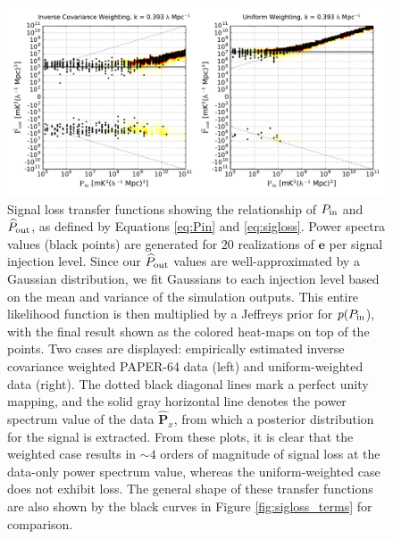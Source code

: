 \documentclass[preprint2,numberedappendix,tighten]{aastex6}  %
\begin{document}
\begin{figure}
	\centering
	\includegraphics[width=1\textwidth]{plots/sigloss_transfercurve_posneg.pdf}
	\caption{Signal loss transfer functions showing the relationship of $P_{\rm in}$ and $\widehat{P}_{\rm out}$, as defined by Equations \eqref{eq:Pin} and \eqref{eq:sigloss}. Power spectra values (black points) are generated for $20$ realizations of $\textbf{e}$ per signal injection level. Since our $\widehat{P}_{\rm out}$ values are well-approximated by a Gaussian distribution, we fit Gaussians to each injection level based on the mean and variance of the simulation outputs. This entire likelihood function is then multiplied by a Jeffreys prior for $p(P_{\rm in}$), with the final result shown as the colored 
heat-maps on top of the points. Two cases are displayed: empirically estimated inverse covariance weighted PAPER-64 data (left) and uniform-weighted data (right). The dotted black 
diagonal lines mark a perfect unity mapping, and the solid gray horizontal line denotes the power spectrum value of the data $\widehat{\textbf{P}}_{x}$, from which a posterior distribution for the signal is extracted. From these plots, it is clear that the weighted case results in $\sim4$ orders of magnitude of signal loss at the data-only power spectrum value, whereas the uniform-weighted case does 
not exhibit loss. The general shape of these transfer functions are also shown by the black curves in Figure \ref{fig:sigloss_terms} for comparison.}
	\label{fig:sigloss_transfercurve}
\end{figure}
\end{document}

